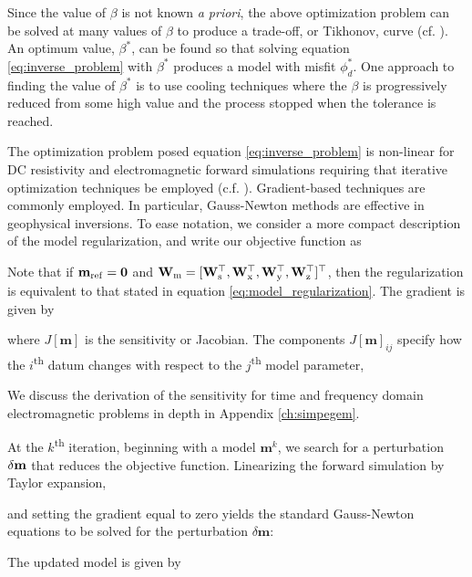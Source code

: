 
Since the value of $\beta$ is not known \emph{a priori}, the above optimization problem can be solved at many values of $\beta$ to produce a trade-off, or Tikhonov, curve (cf. \cite{Parker1994}). An optimum value, $\beta^*$, can be found so that solving equation \ref{eq:inverse_problem} with $\beta^*$ produces a model with misfit $\phi_d^*$. One approach to finding the value of $\beta^*$ is to use cooling techniques where the $\beta$ is progressively reduced from some high value and the process stopped when the tolerance is reached.

The optimization problem posed equation \ref{eq:inverse_problem} is non-linear for DC resistivity and electromagnetic forward simulations requiring that iterative optimization techniques be employed (c.f. \cite{Nocedal1999}). Gradient-based techniques are commonly employed. In particular, Gauss-Newton methods are effective in geophysical inversions. To ease notation, we consider a more compact description of the model regularization, and write our objective function as


Note that if $\mathbf{m}_{\rm ref} = \mathbf{0}$ and $\mathbf{W}_{\rm m} = [\mathbf{W}_{\rm s}^\top, \mathbf{W}_{\rm x}^\top, \mathbf{W}_{\rm y}^\top, \mathbf{W}_{\rm z}^\top]^\top$, then the regularization is equivalent to that stated in equation \ref{eq:model_regularization}. The gradient is given by


where $J[\mathbf{m}]$ is the sensitivity or Jacobian. The components $J[\mathbf{m}]_{ij}$ specify how the $i$\textsuperscript{th} datum changes with respect to the $j$\textsuperscript{th} model parameter,


We discuss the derivation of the sensitivity for time and frequency domain electromagnetic problems in depth in Appendix \ref{ch:simpegem}.

At the $k$\textsuperscript{th} iteration, beginning with a model $\mathbf{m}^{k}$, we search for a perturbation $\delta \mathbf{m}$ that reduces the objective function. Linearizing the forward simulation by Taylor expansion,


and setting the gradient equal to zero yields the standard Gauss-Newton equations
to be solved for the perturbation $\delta \mathbf{m}$:


The updated model is given by

